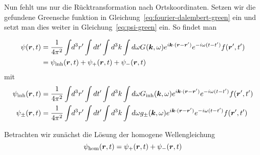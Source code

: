 Nun fehlt uns nur die Rücktransformation nach Ortskoordinaten. Setzen wir die gefundene Greensche funktion in Gleichung~\ref{eq:fourier-dalembert-green} ein und setzt man dies weiter in Gleichung~\ref{eq:psi-green} ein. So findet man
\begin{center}
\begin{equation}
  \begin{split}
    \psi(\vb*r, t)
    &=\frac{1}{4\pi^2} \int_{}\,d^3r'\int dt'
    \int d^3k \int d\omega 
    G_{}(\vb*k,\omega)
    e^{i\vb*k\cdot(\vb*r-\vb*r')}
    e^{-i\omega(t-t')}
    f(\vb*r', t')\\
    &=\psi_\text{inh}(\vb*r, t) + \psi_+(\vb*r, t) + \psi_-(\vb*r, t)\\
  \end{split}
\end{equation}
  mit 
\begin{equation}
  \begin{split}
    \psi_\text{inh}(\vb*r, t)
    &=
    \frac{1}{4\pi^2} \int_{}\,d^3r'\int dt'
    \int d^3k \int d\omega 
    G_\text{inh}(\vb*k, \omega)
    e^{i\vb*k\cdot(\vb*r-\vb*r')}
    e^{-i\omega(t-t')}
    f(\vb*r', t')\\
    \psi_\pm(\vb*r, t)
    &=
    \frac{1}{4\pi^2} \int_{}\,d^3r'\int dt'
    \int d^3k \int d\omega 
    g_\pm(\vb*k, \omega)
    e^{i\vb*k\cdot(\vb*r-\vb*r')}
    e^{-i\omega(t-t')}
    f(\vb*r', t')\\
  \end{split}
\end{equation}
\end{center} 
Betrachten wir zunächst die Lösung der homogene Wellengleichung
\begin{equation}
  \psi_\text{hom}(\vb*r, t) = \psi_+(\vb*r, t) + \psi_-(\vb*r, t)
\end{equation}
